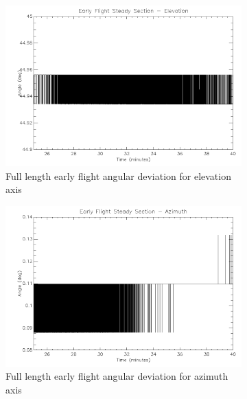 \begin{figure}[h!]
\captionsetup[subfigure]{justification=centering}
\captionsetup{justification=centering}
    \centering
	\begin{subfigure}{0.45\textwidth}
		\includegraphics[width=1\linewidth]{appendix/img/campaign_results/earlyalt.png}
		\caption{Full length early flight angular deviation for elevation axis}
		\label{fig:sub:earlyalt}
	\end{subfigure}
	\begin{subfigure}{0.45\textwidth}
		\includegraphics[width=1\linewidth]{appendix/img/campaign_results/earlyaz.png}
		\caption{Full length early flight angular deviation for azimuth axis}
		\label{fig:sub:earlyaz}
	\end{subfigure}
	\begin{subfigure}{0.45\textwidth}

\end{subfigure}
\end{figure}
